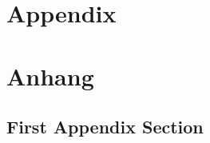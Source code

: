 
{\chapter{Appendix}}    %
{\chapter{Anhang}}      %
\label{chap:appendix}


\section{First Appendix Section}
\label{sec:appendix:FirstSection}
		
\setcounter{figure}{0}
		

